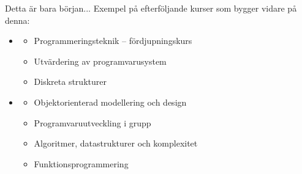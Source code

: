\ifkompendium\else
\begin{SlideExtra}{Detta är bara början... }
Exempel på efterföljande kurser som bygger vidare på denna:
\begin{itemize}
\item {}
\begin{itemize}
\item Programmeringsteknik -- fördjupningskurs
\item Utvärdering av programvarusystem
\item Diskreta strukturer
\end{itemize}
\item {}
\begin{itemize}
\item Objektorienterad modellering och design
\item Programvaruutveckling i grupp
\item Algoritmer, datastrukturer och komplexitet
\item Funktionsprogrammering
\end{itemize}
\end{itemize}
\end{SlideExtra}





